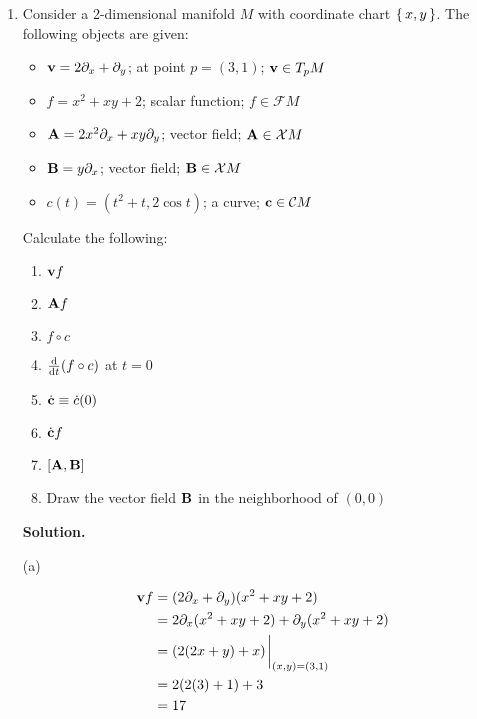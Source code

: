 \documentclass[11pt]{article}
\begin{document}

\begin{enumerate}[start=1,label={\bfseries Exercise \arabic*:},leftmargin=1in] %

    \item Consider a 2-dimensional manifold \(M\) with coordinate chart \(\set{x,y}\). The following objects are given:

        \begin{itemize}
            \item \(\vb{v} = 2\partial_x + \partial_y\); at point \(p = (3,1)\); \(\vb{v} \in T_p M\)
            \item \(f = x^2 + xy + 2\); scalar function; \(f \in \mathcal{F}M\)
            \item \(\vb{A} = 2x^2\partial_x + xy\partial_y\); vector field; \(\vb{A} \in \mathcal{X}M\)
            \item \(\vb{B} = y\partial_x\); vector field; \(\vb{B} \in \mathcal{X}M\)
            \item \(c(t) = (t^2 + t, 2\cos{t})\); a curve; \(\vb{c} \in \mathcal{C}M\)
        \end{itemize}

        \noindent Calculate the following:
        \begin{enumerate}
            \item \(\vb{v}f\)
            \item \(\vb{A}f\)
            \item \( f \circ c  \)
            \item \( \dv{t}(f \circ c) \) at \(t=0\)
            \item \( \dot{\vb{c}} \equiv \dot{c}(0) \)
            \item \( \dot{\vb{c}} f \)
            \item \( [\vb{A}, \vb{B}]  \)
            \item Draw the vector field \(\vb{B}\) in the neighborhood of \((0,0)\)
        \end{enumerate}

        \textbf{Solution.}

        \noindent (a)

        \begin{align*}
            \vb{v}f &= (2\partial_x + \partial_y)(x^2 + xy + 2) \\
                    &= 2 \partial_x(x^2 + xy + 2) + \partial_y(x^2 + xy + 2) \\
                    &= (2(2x + y) + x) \eval_{(x,y)=(3,1)} \\
                    &= 2(2(3)+1) + 3 \\
                    &= 17
        \end{align*}


\end{enumerate}
\end{document}
